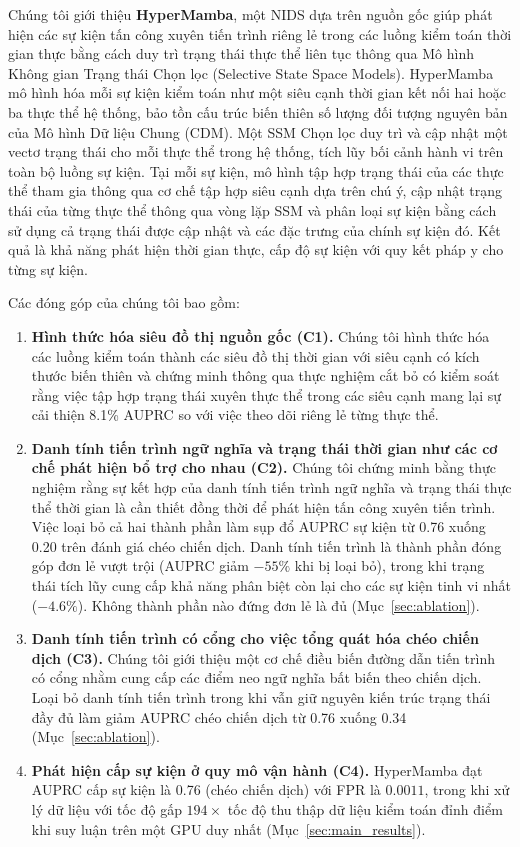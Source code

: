 \documentclass[letterpaper,twocolumn,10pt]{article}
\begin{document}
Chúng tôi giới thiệu \textbf{HyperMamba}, một NIDS dựa trên nguồn gốc giúp phát hiện các sự kiện tấn công xuyên tiến trình riêng lẻ trong các luồng kiểm toán thời gian thực bằng cách duy trì trạng thái thực thể liên tục thông qua Mô hình Không gian Trạng thái Chọn lọc (Selective State Space Models). HyperMamba mô hình hóa mỗi sự kiện kiểm toán như một siêu cạnh thời gian kết nối hai hoặc ba thực thể hệ thống, bảo tồn cấu trúc biến thiên số lượng đối tượng nguyên bản của Mô hình Dữ liệu Chung (CDM). Một SSM Chọn lọc duy trì và cập nhật một vectơ trạng thái cho mỗi thực thể trong hệ thống, tích lũy bối cảnh hành vi trên toàn bộ luồng sự kiện. Tại mỗi sự kiện, mô hình tập hợp trạng thái của các thực thể tham gia thông qua cơ chế tập hợp siêu cạnh dựa trên chú ý, cập nhật trạng thái của từng thực thể thông qua vòng lặp SSM và phân loại sự kiện bằng cách sử dụng cả trạng thái được cập nhật và các đặc trưng của chính sự kiện đó. Kết quả là khả năng phát hiện thời gian thực, cấp độ sự kiện với quy kết pháp y cho từng sự kiện.

Các đóng góp của chúng tôi bao gồm:
\begin{enumerate}
    \item \textbf{Hình thức hóa siêu đồ thị nguồn gốc (C1).} Chúng tôi hình thức hóa các luồng kiểm toán thành các siêu đồ thị thời gian với siêu cạnh có kích thước biến thiên và chứng minh thông qua thực nghiệm cắt bỏ có kiểm soát rằng việc tập hợp trạng thái xuyên thực thể trong các siêu cạnh mang lại sự cải thiện 8.1\% AUPRC so với việc theo dõi riêng lẻ từng thực thể.

    \item \textbf{Danh tính tiến trình ngữ nghĩa và trạng thái thời gian như các cơ chế phát hiện bổ trợ cho nhau (C2).} Chúng tôi chứng minh bằng thực nghiệm rằng sự kết hợp của danh tính tiến trình ngữ nghĩa và trạng thái thực thể thời gian là cần thiết đồng thời để phát hiện tấn công xuyên tiến trình. Việc loại bỏ cả hai thành phần làm sụp đổ AUPRC sự kiện từ 0.76 xuống 0.20 trên đánh giá chéo chiến dịch. Danh tính tiến trình là thành phần đóng góp đơn lẻ vượt trội (AUPRC giảm $-55\%$ khi bị loại bỏ), trong khi trạng thái tích lũy cung cấp khả năng phân biệt còn lại cho các sự kiện tinh vi nhất ($-4.6\%$). Không thành phần nào đứng đơn lẻ là đủ (Mục~\ref{sec:ablation}).

    \item \textbf{Danh tính tiến trình có cổng cho việc tổng quát hóa chéo chiến dịch (C3).} Chúng tôi giới thiệu một cơ chế điều biến đường dẫn tiến trình có cổng nhằm cung cấp các điểm neo ngữ nghĩa bất biến theo chiến dịch. Loại bỏ danh tính tiến trình trong khi vẫn giữ nguyên kiến trúc trạng thái đầy đủ làm giảm AUPRC chéo chiến dịch từ 0.76 xuống 0.34 (Mục~\ref{sec:ablation}).

    \item \textbf{Phát hiện cấp sự kiện ở quy mô vận hành (C4).} HyperMamba đạt AUPRC cấp sự kiện là 0.76 (chéo chiến dịch) với FPR là $0.0011$, trong khi xử lý dữ liệu với tốc độ gấp $194\times$ tốc độ thu thập dữ liệu kiểm toán đỉnh điểm khi suy luận trên một GPU duy nhất (Mục~\ref{sec:main_results}).
\end{enumerate}
\end{document}

